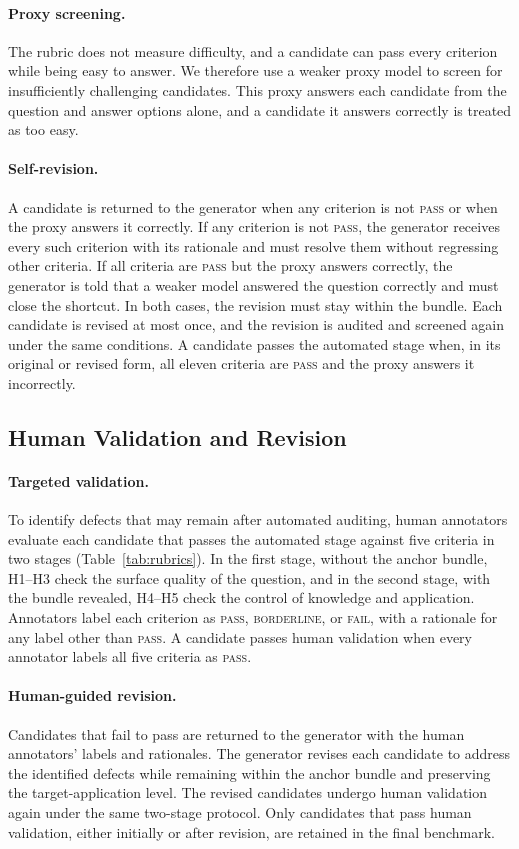 \paragraph{Proxy screening.}
The rubric does not measure difficulty, and a candidate can pass every criterion while being easy to answer.
We therefore use a weaker proxy model to screen for insufficiently challenging candidates.
This proxy answers each candidate from the question and answer options alone, and a candidate it answers correctly is treated as too easy.

\paragraph{Self-revision.}
A candidate is returned to the generator when any criterion is not \textsc{pass} or when the proxy answers it correctly.
If any criterion is not \textsc{pass}, the generator receives every such criterion with its rationale and must resolve them without regressing other criteria.
If all criteria are \textsc{pass} but the proxy answers correctly, the generator is told that a weaker model answered the question correctly and must close the shortcut.
In both cases, the revision must stay within the bundle.
Each candidate is revised at most once, and the revision is audited and screened again under the same conditions.
A candidate passes the automated stage when, in its original or revised form, all eleven criteria are \textsc{pass} and the proxy answers it incorrectly.


\subsection{Human Validation and Revision}
\label{sec:human}

\paragraph{Targeted validation.}
To identify defects that may remain after automated auditing, human annotators evaluate each candidate that passes the automated stage against five criteria in two stages (Table~\ref{tab:rubrics}).
In the first stage, without the anchor bundle, H1--H3 check the surface quality of the question, and in the second stage, with the bundle revealed, H4--H5 check the control of knowledge and application.
Annotators label each criterion as \textsc{pass}, \textsc{borderline}, or \textsc{fail}, with a rationale for any label other than \textsc{pass}.
A candidate passes human validation when every annotator labels all five criteria as \textsc{pass}.

\paragraph{Human-guided revision.}
Candidates that fail to pass are returned to the generator with the human annotators' labels and rationales.
The generator revises each candidate to address the identified defects while remaining within the anchor bundle and preserving the target-application level.
The revised candidates undergo human validation again under the same two-stage protocol.
Only candidates that pass human validation, either initially or after revision, are retained in the final benchmark.